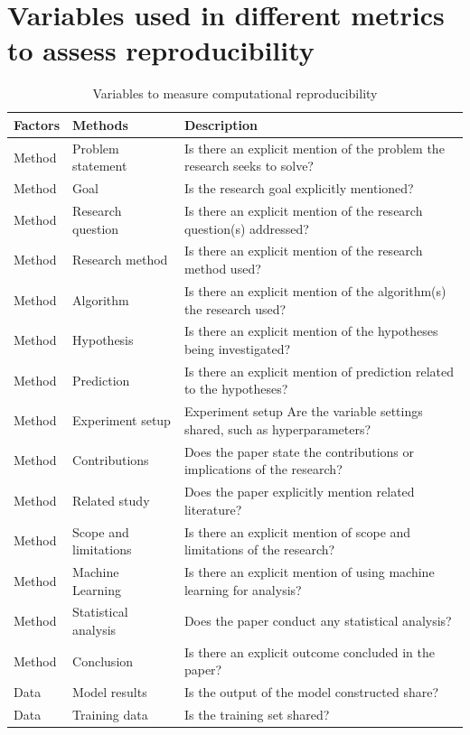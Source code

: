 \documentclass[
10pt, %
a4paper, %
oneside, %
headinclude,footinclude, %
BCOR5mm, %
]{scrartcl}
\begin{document}
\section{Variables used in different metrics to assess reproducibility} \label{appendix:tables_for_metrics_to_assess_reproducibility}
\begin{table}[!htb]
\caption{Variables to measure computational reproducibility}
\centering
\label{table:variables_25}
\begin{tabular}{|p{1.7cm}|p{2.9cm}|p{9cm}|}
\hline
Factors & Methods & Description \\
\hline
Method & Problem statement & Is there an explicit mention of the problem the research seeks to solve? \\
Method & Goal & Is the research goal explicitly mentioned? \\
Method &  Research question & Is there an explicit mention of the research question(s) addressed? \\
Method &  Research method& Is there an explicit mention of the research method used? \\
Method & Algorithm & Is there an explicit mention of the algorithm(s) the research used?  \\
Method & Hypothesis & Is there an explicit mention of the hypotheses being investigated? \\
Method & Prediction &  Is there an explicit mention of prediction related to the hypotheses? \\
Method & Experiment setup & Experiment setup Are the variable settings shared, such as hyperparameters? \\
Method & Contributions & Does the paper state the contributions or implications of the research? \\
Method & Related study & Does the paper explicitly mention related literature? \\
Method & Scope and limitations & Is there an explicit mention of scope and limitations of the research? \\
Method & Machine Learning & Is there an explicit mention of using machine learning for analysis? \\
Method & Statistical analysis & Does the paper conduct any statistical analysis? \\
Method & Conclusion & Is there an explicit outcome concluded in the paper? \\
Data & Model results & Is the output of the model constructed share? \\
Data & Training data & Is the training set shared? \\

\end{tabular}
\end{table}
\end{document}
